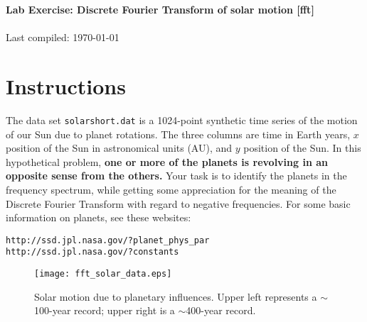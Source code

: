 \documentclass[11pt,titlepage,fleqn]{article}
\begin{document}

\begin{spacing}{1.2}
\centering
{\large \bf Lab Exercise: Discrete Fourier Transform of solar motion [fft]} \\
\cltag\ \\
Last compiled: \today \\
\end{spacing}


\section*{Instructions}

The data set \verb+solarshort.dat+ is a 1024-point synthetic time series of the motion of our Sun due to planet rotations. The three columns are time in Earth years, $x$ position of the Sun in astronomical units (AU), and $y$ position of the Sun. In this hypothetical problem, {\bf one or more of the planets is revolving in an opposite sense from the others.} Your task is to identify the planets in the frequency spectrum, while getting some appreciation for the meaning of the Discrete Fourier Transform with regard to negative frequencies. For some basic information on planets, see these websites:
%
\begin{verbatim}
http://ssd.jpl.nasa.gov/?planet_phys_par
http://ssd.jpl.nasa.gov/?constants
\end{verbatim}

\begin{figure}[h]
\centering
\texttt{[image: fft\_solar\_data.eps]}
\caption[]
{{
Solar motion due to planetary influences. Upper left represents a $\sim$100-year record; upper right is a $\sim$400-year record.
\label{fig:solar}
}}
\end{figure}

\end{document}
